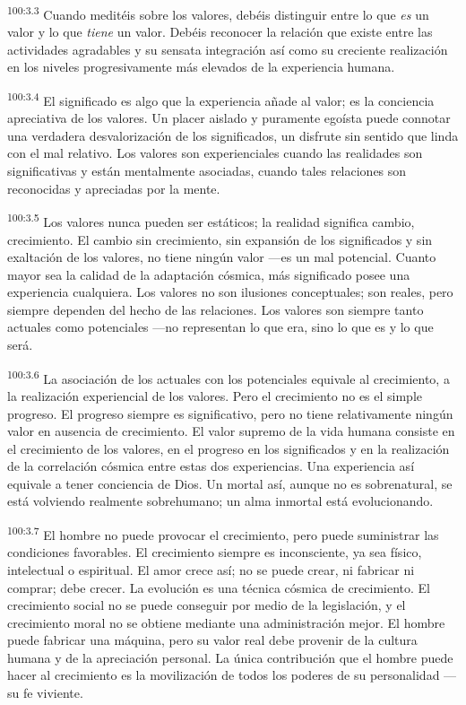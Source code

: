 \documentclass[twoside, 11pt]{book}
\begin{document}
\par
\textsuperscript{100:3.3} Cuando meditéis sobre los valores, debéis distinguir entre lo que \textit{es} un valor y lo que \textit{tiene} un valor. Debéis reconocer la relación que existe entre las actividades agradables y su sensata integración así como su creciente realización en los niveles progresivamente más elevados de la experiencia humana.

\par
\textsuperscript{100:3.4} El significado es algo que la experiencia añade al valor; es la conciencia apreciativa de los valores. Un placer aislado y puramente egoísta puede connotar una verdadera desvalorización de los significados, un disfrute sin sentido que linda con el mal relativo. Los valores son experienciales cuando las realidades son significativas y están mentalmente asociadas, cuando tales relaciones son reconocidas y apreciadas por la mente.

\par
\textsuperscript{100:3.5} Los valores nunca pueden ser estáticos; la realidad significa cambio, crecimiento. El cambio sin crecimiento, sin expansión de los significados y sin exaltación de los valores, no tiene ningún valor ---es un mal potencial. Cuanto mayor sea la calidad de la adaptación cósmica, más significado posee una experiencia cualquiera. Los valores no son ilusiones conceptuales; son reales, pero siempre dependen del hecho de las relaciones. Los valores son siempre tanto actuales como potenciales ---no representan lo que era, sino lo que es y lo que será.

\par
\textsuperscript{100:3.6} La asociación de los actuales con los potenciales equivale al crecimiento, a la realización experiencial de los valores. Pero el crecimiento no es el simple progreso. El progreso siempre es significativo, pero no tiene relativamente ningún valor en ausencia de crecimiento. El valor supremo de la vida humana consiste en el crecimiento de los valores, en el progreso en los significados y en la realización de la correlación cósmica entre estas dos experiencias. Una experiencia así equivale a tener conciencia de Dios. Un mortal así, aunque no es sobrenatural, se está volviendo realmente sobrehumano; un alma inmortal está evolucionando.

\par
\textsuperscript{100:3.7} El hombre no puede provocar el crecimiento, pero puede suministrar las condiciones favorables. El crecimiento siempre es inconsciente, ya sea físico, intelectual o espiritual. El amor crece así; no se puede crear, ni fabricar ni comprar; debe crecer. La evolución es una técnica cósmica de crecimiento. El crecimiento social no se puede conseguir por medio de la legislación, y el crecimiento moral no se obtiene mediante una administración mejor. El hombre puede fabricar una máquina, pero su valor real debe provenir de la cultura humana y de la apreciación personal. La única contribución que el hombre puede hacer al crecimiento es la movilización de todos los poderes de su personalidad ---su fe viviente.
\end{document}

